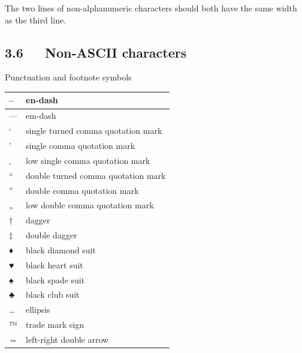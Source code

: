 \documentclass[a4paper]{article}
\newlength{\DUtablewidth} %
\begin{document}
The two lines of non-alphanumeric characters should both have the same
width as the third line.


\subsection{3.6   Non-ASCII characters%
  \label{non-ascii-characters}%
}

Punctuation and footnote symbols

\setlength{\DUtablewidth}{\linewidth}
\begin{longtable*}[c]{|p{0.028\DUtablewidth}|p{0.424\DUtablewidth}|}
\hline

–
 & 
en-dash
 \\
\hline

—
 & 
em-dash
 \\
\hline

‘
 & 
single turned comma quotation mark
 \\
\hline

’
 & 
single comma quotation mark
 \\
\hline

‚
 & 
low single comma quotation mark
 \\
\hline

“
 & 
double turned comma quotation mark
 \\
\hline

”
 & 
double comma quotation mark
 \\
\hline

„
 & 
low double comma quotation mark
 \\
\hline

†
 & 
dagger
 \\
\hline

‡
 & 
double dagger
 \\
\hline

♦
 & 
black diamond suit
 \\
\hline

♥
 & 
black heart suit
 \\
\hline

♠
 & 
black spade suit
 \\
\hline

♣
 & 
black club suit
 \\
\hline

…
 & 
ellipsis
 \\
\hline

™
 & 
trade mark sign
 \\
\hline

⇔
 & 
left-right double arrow
 \\
\hline
\end{longtable*}
\end{document}
